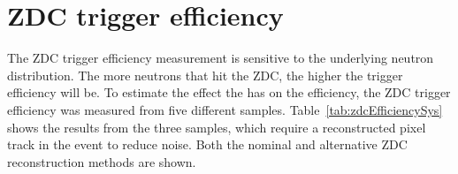   \section{ZDC trigger efficiency}
    The ZDC trigger efficiency measurement is sensitive to the underlying 
      neutron distribution.
    The more neutrons \DIFaddbegin {}\DIFaddend that hit the ZDC, the higher the trigger 
      efficiency will be.
    To estimate the effect the \DIFdelbegin {}\DIFdelend \DIFaddbegin {}\DIFaddend has on the 
      efficiency, the ZDC trigger efficiency was measured from five different 
      samples.
    Table~\ref{tab:zdcEfficiencySys} shows the results from the 
      three samples, which require a reconstructed pixel track in the event to 
      reduce noise. 
    Both the nominal and alternative ZDC reconstruction methods are shown.
